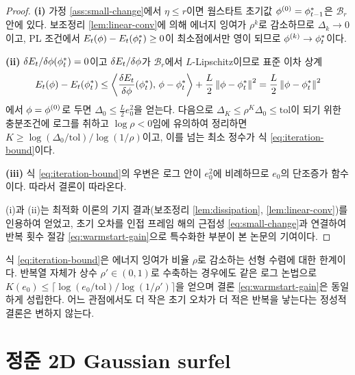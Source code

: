 \begin{proof}
\textbf{(i)} 가정 \ref{ass:small-change}에서 $\eta \le r$이면 웜스타트 초기값
$\phi^{(0)}=\phi^*_{t-1}$은 $\mathcal{B}_r$ 안에 있다. 보조정리
\ref{lem:linear-conv}에 의해 에너지 잉여가 $\rho^k$로 감소하므로 $\Delta_k\to0$이고,
PL 조건에서 $E_t(\phi)-E_t(\phi^*_t)\ge0$이 최소점에서만 영이 되므로
$\phi^{(k)}\to\phi^*_t$이다.

\textbf{(ii)} $\delta E_t/\delta\phi(\phi^*_t)=0$이고 $\delta E_t/\delta\phi$가
$\mathcal{B}_r$에서 $L$-Lipschitz이므로 표준 이차 상계
\[
  E_t(\phi)-E_t(\phi^*_t)
  \le \left\langle \frac{\delta E_t}{\delta\phi}(\phi^*_t),\, \phi-\phi^*_t \right\rangle
  + \frac{L}{2}\left\lVert \phi-\phi^*_t \right\rVert^2
  = \frac{L}{2}\left\lVert \phi-\phi^*_t \right\rVert^2
\]
에서 $\phi=\phi^{(0)}$로 두면 $\Delta_0 \le \tfrac{L}{2}e_0^2$을 얻는다. 다음으로
$\Delta_K \le \rho^K\Delta_0 \le \mathrm{tol}$이 되기 위한 충분조건에 로그를 취하고
$\log\rho<0$임에 유의하여 정리하면
$K \ge \log(\Delta_0/\mathrm{tol})/\log(1/\rho)$이고, 이를 넘는 최소 정수가
식 \eqref{eq:iteration-bound}이다.

\textbf{(iii)} 식 \eqref{eq:iteration-bound}의 우변은 로그 안이 $e_0^2$에 비례하므로
$e_0$의 단조증가 함수이다. 따라서 결론이 따라온다.

(i)과 (ii)는 최적화 이론의 기지 결과(보조정리 \ref{lem:dissipation},
\ref{lem:linear-conv})를 인용하여 얻었고, 초기 오차를 인접 프레임 해의 근접성
\eqref{eq:small-change}과 연결하여 반복 횟수 절감 \eqref{eq:warmstart-gain}으로
특수화한 부분이 본 논문의 기여이다.
\end{proof}

\begin{remark}[선형 수렴 대 수축]
식 \eqref{eq:iteration-bound}은 에너지 잉여가 비율 $\rho$로 감소하는 선형 수렴에 대한
한계이다. 반복열 자체가 상수 $\rho'\in(0,1)$로 수축하는 경우에도 같은 로그 논법으로
$K(e_0)\le\lceil \log(e_0/\mathrm{tol})/\log(1/\rho')\rceil$을 얻으며 결론
\eqref{eq:warmstart-gain}은 동일하게 성립한다. 어느 관점에서도 더 작은 초기 오차가
더 적은 반복을 낳는다는 정성적 결론은 변하지 않는다.
\end{remark}


\section{정준 2D Gaussian surfel}
\label{sec:canonical}

